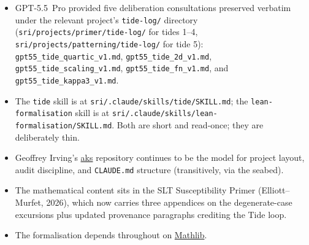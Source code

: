\documentclass[11pt]{article}
\begin{document}
\begin{itemize}
\item GPT-5.5~Pro provided five deliberation consultations preserved
verbatim under the relevant project's \texttt{tide-log/} directory (\texttt{sri/projects/primer/tide-log/} for tides 1--4, \texttt{sri/projects/patterning/tide-log/} for tide 5):
\texttt{gpt55\_tide\_quartic\_v1.md},
\texttt{gpt55\_tide\_2d\_v1.md},
\texttt{gpt55\_tide\_scaling\_v1.md},
\texttt{gpt55\_tide\_fn\_v1.md}, and
\texttt{gpt55\_tide\_kappa3\_v1.md}.
\item The \texttt{tide} skill is at
\texttt{sri/.claude/skills/tide/SKILL.md}; the
\texttt{lean-formalisation} skill is at
\texttt{sri/.claude/skills/lean-formalisation/SKILL.md}. Both are
short and read-once; they are deliberately thin.
\item Geoffrey Irving's \href{https://github.com/girving/aks}{aks}
repository continues to be the model for project layout, audit
discipline, and \texttt{CLAUDE.md} structure (transitively, via the
seabed).
\item The mathematical content sits in the SLT Susceptibility Primer
(Elliott--Murfet, 2026), which now carries three appendices on the
degenerate-case excursions plus updated provenance paragraphs
crediting the Tide loop.
\item The formalisation depends throughout on
\href{https://github.com/leanprover-community/mathlib4}{Mathlib}.
\end{itemize}
\end{document}
